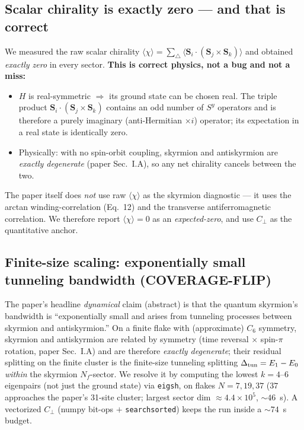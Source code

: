\documentclass[11pt]{article}
\newcommand{\Svec}{\mathbf{S}}
\newcommand{\Cperp}{C_{\perp}}
\begin{document}
\subsection{Scalar chirality is exactly zero --- and that is correct}
We measured the raw scalar chirality
$\langle\chi\rangle = \sum_\triangle \langle\Svec_i\cdot(\Svec_j\times\Svec_k)\rangle$ and obtained
\emph{exactly zero} in every sector. \textbf{This is correct physics, not a bug and not a miss:}
\begin{itemize}
\item $H$ is real-symmetric $\Rightarrow$ its ground state can be chosen real. The triple product
$\Svec_i\cdot(\Svec_j\times\Svec_k)$ contains an odd number of $S^y$ operators and is therefore a
purely imaginary (anti-Hermitian $\times i$) operator; its expectation in a real state is
identically zero.
\item Physically: with no spin-orbit coupling, skyrmion and antiskyrmion are \emph{exactly
degenerate} (paper Sec.~I.A), so any net chirality cancels between the two.
\end{itemize}
The paper itself does \emph{not} use raw $\langle\chi\rangle$ as the skyrmion diagnostic --- it uses
the arctan winding-correlation (Eq.~12) and the transverse antiferromagnetic correlation. We
therefore report $\langle\chi\rangle=0$ as an \emph{expected-zero}, and use $\Cperp$ as the
quantitative anchor.

\subsection{Finite-size scaling: exponentially small tunneling bandwidth (COVERAGE-FLIP)}
The paper's headline \emph{dynamical} claim (abstract) is that the quantum skyrmion's bandwidth is
``exponentially small and arises from tunneling processes between skyrmion and antiskyrmion.'' On a
finite flake with (approximate) $C_6$ symmetry, skyrmion and antiskyrmion are related by symmetry
(time reversal $\times$ spin-$\pi$ rotation, paper Sec.~I.A) and are therefore \emph{exactly
degenerate}; their residual splitting on the finite cluster is the finite-size tunneling splitting
$\Delta_{\rm tun}=E_1-E_0$ \emph{within} the skyrmion $N_f$-sector. We resolve it by computing the
lowest $k=4$--$6$ eigenpairs (not just the ground state) via \texttt{eigsh}, on flakes
$N=7,19,37$ ($37$ approaches the paper's 31-site cluster; largest sector dim $\approx 4.4\times10^5$,
$\sim46$~s). A vectorized $\Cperp$ (numpy bit-ops $+$ \texttt{searchsorted}) keeps the run inside a
$\sim74$~s budget.
\end{document}
